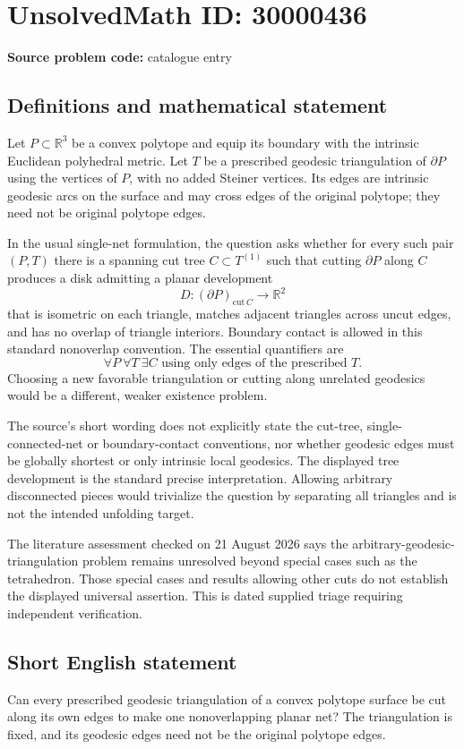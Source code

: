 \documentclass[11pt]{article}
\newcommand{\R}{\mathbb{R}}
\begin{document}
\section*{UnsolvedMath ID: 30000436}
\textbf{Source problem code:} catalogue entry
\subsection{Definitions and mathematical statement}
Let $P\subset\R^3$ be a convex polytope and equip its boundary with the intrinsic Euclidean polyhedral metric. Let $T$ be a prescribed geodesic triangulation of $\partial P$ using the vertices of $P$, with no added Steiner vertices. Its edges are intrinsic geodesic arcs on the surface and may cross edges of the original polytope; they need not be original polytope edges.

In the usual single-net formulation, the question asks whether for every such pair $(P,T)$ there is a spanning cut tree $C\subset T^{(1)}$ such that cutting $\partial P$ along $C$ produces a disk admitting a planar development
\[
 D:(\partial P)_{\mathrm{cut}\,C}\longrightarrow\R^2
\]
that is isometric on each triangle, matches adjacent triangles across uncut edges, and has no overlap of triangle interiors. Boundary contact is allowed in this standard nonoverlap convention. The essential quantifiers are
\[
 \forall P\ \forall T\ \exists C\text{ using only edges of the prescribed }T.
\]
Choosing a new favorable triangulation or cutting along unrelated geodesics would be a different, weaker existence problem.

The source's short wording does not explicitly state the cut-tree, single-connected-net or boundary-contact conventions, nor whether geodesic edges must be globally shortest or only intrinsic local geodesics. The displayed tree development is the standard precise interpretation. Allowing arbitrary disconnected pieces would trivialize the question by separating all triangles and is not the intended unfolding target.

The literature assessment checked on 21 August 2026 says the arbitrary-geodesic-triangulation problem remains unresolved beyond special cases such as the tetrahedron. Those special cases and results allowing other cuts do not establish the displayed universal assertion. This is dated supplied triage requiring independent verification.
\subsection{Short English statement}
Can every prescribed geodesic triangulation of a convex polytope surface be cut along its own edges to make one nonoverlapping planar net? The triangulation is fixed, and its geodesic edges need not be the original polytope edges.
\end{document}
